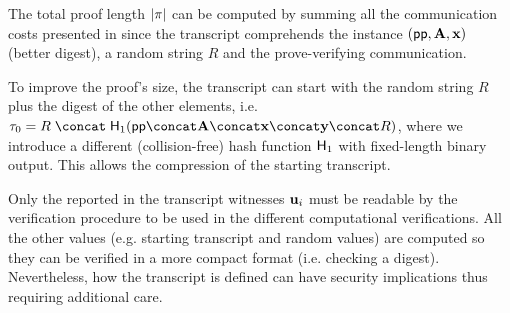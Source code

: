 \vspace{3mm}

The total proof length $\card{\proof}$ can be computed by summing all the communication costs
presented in 
since the transcript comprehends the instance $(\pp,\vA,\vx)$ (better digest),
a random string $R$ and the prove-verifying communication.

To improve the proof's size, the transcript can start with the random string $R$ plus the
digest of the other elements, i.e.
$\transcript[0] = R\;\concat\;\hashf[1]{\pp\concat\vA\concat\vx\concat\vy\concat R}$, where we introduce
a different (collision-free) hash function $\hashf[1]{}$ with fixed-length binary output.
This allows the compression of the starting transcript.

Only the reported in the transcript witnesses $\vu[i]$ must be readable by the
verification procedure to be used in the different computational verifications.
All the other values (e.g. starting transcript and random values)
are computed so they can be verified in a more compact format (i.e. checking a digest).
%
Nevertheless, how the transcript is defined can have security implications thus requiring additional care.

